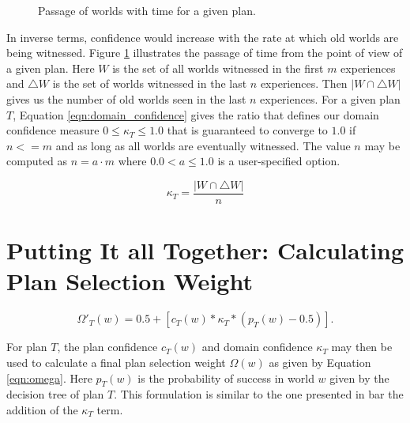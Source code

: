 \documentclass[a4paper]{article}
\begin{document}
\begin{figure}[ht]
\begin{center}
\end{center}
\caption{Passage of worlds with time for a given plan.}
\label{fig:domain_confidence}
\end{figure}

In inverse terms, confidence would increase with the rate at which old worlds are being witnessed. Figure \ref{fig:domain_confidence} illustrates the passage of time from the point of view of a given plan. Here $W$ is the set of all worlds witnessed in the first $m$ experiences and $\triangle W$ is the set of worlds witnessed in the last $n$ experiences. Then $|W \cap \triangle W|$ gives us the number of old worlds seen in the last $n$ experiences. For a given plan $T$, Equation \ref{eqn:domain_confidence} gives the ratio that defines our domain confidence measure $0 \leq \kappa_T \leq 1.0$ that is guaranteed to converge to $1.0$ if $n<=m$ and as long as all worlds are eventually witnessed. The value $n$ may be computed as $n=a \cdot m$ where $0.0 < a \leq 1.0$ is a user-specified option.


\begin{equation}
\kappa_T = \frac{| W \cap \triangle W |}{n}
\label{eqn:domain_confidence}
\end{equation}


\section{Putting It all Together: Calculating Plan Selection Weight}

\begin{equation}
\Omega'_T(w) = 0.5 + \left[  c_T(w) *  \kappa_T * \left( p_T(w) - 0.5 \right)  \right].
\label{eqn:omega}
\end{equation}

For plan $T$, the plan confidence $c_T(w)$ and domain confidence $\kappa_T$ may then be used to calculate a final plan selection weight $\Omega(w)$ as given by Equation \ref{eqn:omega}. Here $p_T(w)$ is the probability of success in world $w$ given by the decision tree of plan $T$. This formulation is similar to the one presented in \cite{Singh:AAMAS10} bar the addition of the $\kappa_T$ term.
\end{document}
